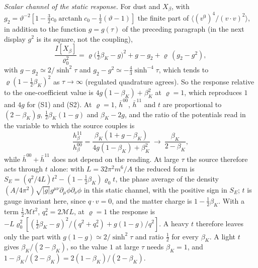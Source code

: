 \emph{Scalar channel of the static response.} For dust and \(X_\beta\), with \(g_2=\vartheta^{-2}[1-\tfrac32c_0\operatorname{arctanh}c_0-\tfrac12(\vartheta-1)]\) the finite part of \(\langle(v^0)^4/(v\cdot v)^2\rangle\), in addition to the function \(g=g(\tau)\) of the preceding paragraph (in the next display \(g^2\) is its square, not the coupling),
\[
\frac{I[X_\beta]}{\varrho_0^2}=\varrho\bigl(\tfrac12\beta_K-g\bigr)^2+g-g_2+\varrho\,(g_2-g^2),
\]
with \(g-g_2\simeq2/\sinh^2\tau\) and \(g_2-g^2\simeq-\tfrac43\sinh^{-4}\tau\), which tends to \(\varrho(1-\tfrac12\beta_K)^2\) as \(\tau\to\infty\) (regulated quadrature agrees). So the response relative to the one-coefficient value is \(4g(1-\beta_K)+\beta_K^2\) at \(\varrho=1\), which reproduces \(1\) and \(4g\) for (S1) and (S2). At \(\varrho=1\), \(\bar h^{00}\), \(\bar h^{11}\) and \(t\) are proportional to \((2-\beta_K)g\), \(\tfrac12\beta_K(1-g)\) and \(\beta_K-2g\), and the ratio of the potentials read in the variable to which the source couples is
\[
\frac{h_\beta^{11}}{h_\beta^{00}}=\frac{\beta_K(1+g-\beta_K)}{4g(1-\beta_K)+\beta_K^2}\ \longrightarrow\ \frac{\beta_K}{2-\beta_K},
\]
while \(\bar h^{00}+\bar h^{11}\) does not depend on the reading. At large \(\tau\) the source therefore acts through \(t\) alone: with \(L=32\pi^2m^6/A\) the reduced form is \(S_E=(q^2/4L)t^2-(1-\tfrac12\beta_K)\varrho_0t\), the phase average of the density \((A/4\pi^2)\sqrt{|g|}g^{\mu\nu}\partial_\mu\phi\partial_\nu\phi\) in this static channel, with the positive sign in \(S_E\); \(t\) is gauge invariant here, since \(q\cdot v=0\), and the matter charge is \(1-\tfrac12\beta_K\). With a term \(\tfrac12\mathcal Mt^2\), \(q_*^2=2\mathcal ML\), at \(\varrho=1\) the response is \(-L\varrho_0^2[(\tfrac12\beta_K-g)^2/(q^2+q_*^2)+g(1-g)/q^2]\). A heavy \(t\) therefore leaves only the part with \(g(1-g)\simeq2/\sinh^2\tau\) and ratio \(\tfrac12\) for every \(\beta_K\). A light \(t\) gives \(\beta_K/(2-\beta_K)\), so the value \(1\) at large \(\tau\) needs \(\beta_K=1\), and \(1-\beta_K/(2-\beta_K)=2(1-\beta_K)/(2-\beta_K)\).

